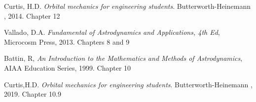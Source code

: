 \documentclass[11pt,a4paper]{report}
\begin{document}
\begin{thebibliography}{9}
Curtis, H.D. 
\textit{Orbital mechanics for engineering students}. 
Butterworth-Heinemann , 2014. Chapter 12

Vallado, D.A.
\textit{Fundamental of Astrodynamics and Applications, 4th
Ed}, Microcosm Press, 2013. Chapters 8 and 9

Battin, R,
\textit{An Introduction to the Mathematics and Methods of
Astrodynamics}, AIAA Education Series, 1999. Chapter 10

Curtis,H.D. 
\textit{Orbital mechanics for engineering students}. 
Butterworth-Heinemann , 2019. Chapter 10.9

\end{thebibliography}
\end{document}
